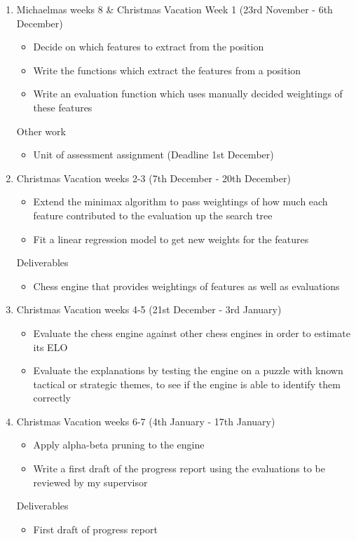 \documentclass[12pt,a4paper]{article}
\begin{document}
\begin{enumerate}
    \item Michaelmas weeks 8 \& Christmas Vacation Week 1 (23rd November - 6th December)
    \begin{itemize}
        \item Decide on which features to extract from the position
        \item Write the functions which extract the features from a position
        \item Write an evaluation function which uses manually decided weightings of these features
    \end{itemize}
    Other work
    \begin{itemize}
        \item Unit of assessment assignment (Deadline 1st December)
    \end{itemize}

    \item Christmas Vacation weeks 2-3 (7th December - 20th December)
    \begin{itemize}
        \item Extend the minimax algorithm to pass weightings of how much each feature contributed to the evaluation up the search tree
        \item Fit a linear regression model to get new weights for the features
    \end{itemize}
    Deliverables
    \begin{itemize}
        \item Chess engine that provides weightings of features as well as evaluations
    \end{itemize}

    \item Christmas Vacation weeks 4-5 (21st December - 3rd January)
    \begin{itemize}
        \item Evaluate the chess engine against other chess engines in order to estimate its ELO
        \item Evaluate the explanations by testing the engine on a puzzle with known tactical or strategic themes, to see if the engine is able to identify them correctly
    \end{itemize}

    \item Christmas Vacation weeks 6-7 (4th January - 17th January)
    \begin{itemize}
        \item Apply alpha-beta pruning to the engine
        \item Write a first draft of the progress report using the evaluations to be reviewed by my supervisor
    \end{itemize}
    Deliverables
    \begin{itemize}
        \item First draft of progress report
    \end{itemize}


\end{enumerate}
\end{document}
